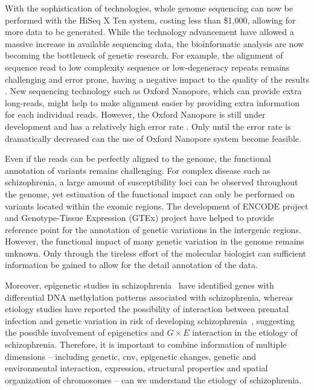 \documentclass[12pt]{scrbook}
\newcommand*{\scz}{schizophrenia}
\begin{document}
With the sophistication of technologies, whole genome sequencing can now be performed with the HiSeq \RN{10} Ten system, costing less than \$1,000, allowing for more data to be generated. 
While the technology advancement have allowed a massive increase in available sequencing data, the bioinformatic analysis are now becoming the bottleneck of genetic research.
For example, the alignment of sequence read to low complexity sequence or low-degeneracy repeats remains challenging and error prone, having a negative impact to the quality of the results \citep{Sims2014}. 
New sequencing technology such as Oxford Nanopore, which can provide extra long-reads, might help to make alignment easier by providing extra information for each individual reads.
However, the Oxford Nanopore is still under development and has a relatively high error rate \citep{Mikheyev2014}. 
Only until the error rate is dramatically decreased can the use of Oxford Nanopore system become feasible. 
	
Even if the reads can be perfectly aligned to the genome, the functional annotation of variants remains challenging.
For complex disease such as \scz, a large amount of susceptibility loci can be observed throughout the genome, yet estimation of the functional impact can only be performed on variants located within the exomic regions.
The development of ENCODE project \citep{ENCODEProjectConsortium2012} and Genotype-Tissue Expression (GTEx) project \citep{Consortium2015} have helped to provide reference point for the annotation of genetic variations in the intergenic regions.
However, the functional impact of many genetic variation in the genome remains unknown. 
Only through the tireless effort of the molecular biologist can sufficient information be gained to allow for the detail annotation of the data.
	
Moreover, epigenetic studies in \scz\ \citep{Wockner2014,Nishioka2012} have identified genes with differential DNA methylation patterns associated with \scz, whereas etiology studies have reported the possibility of interaction between prenatal infection and genetic variation in risk of developing \scz\ \citep{Tienari2004,Clarke2009}, suggesting the possible involvement of epigenetics and $G\times E$ interaction in the etiology of \scz.
Therefore, it is important to combine information of multiple dimensions -- including genetic, \gls{cnv}, epigenetic changes, genetic and environmental interaction, expression, structural properties and spatial organization of chromosomes --  can we understand the etiology of \scz.
	
	\backmatter
	\printbibliography[heading=bibintoc,title={Bibliography}]
	
\end{document}
